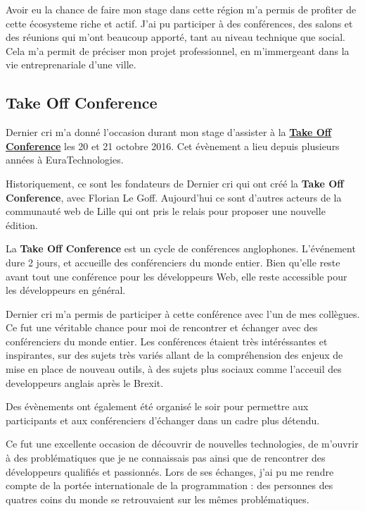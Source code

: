 \bigskip

Avoir eu la chance de faire mon stage dans cette région m'a permis de
profiter de cette écosysteme riche et actif. J'ai pu participer à des
conférences, des salons et des réunions qui m'ont beaucoup apporté, tant
au niveau technique que social. Cela m'a permit de préciser mon projet
professionnel, en m'immergeant dans la vie entreprenariale d'une ville.

\bigskip

\subsection{Take Off Conference}\label{take-off-conference}

\bigskip

Dernier cri m'a donné l'occasion durant mon stage d'assister à la
\href{http://takeoffconf.com/2016}{\textbf{Take Off Conference}} les 20
et 21 octobre 2016. Cet évènement a lieu depuis plusieurs années à
EuraTechnologies.

\bigskip

Historiquement, ce sont les fondateurs de Dernier cri qui ont créé la
\textbf{Take Off Conference}, avec Florian Le Goff. Aujourd'hui ce sont
d'autres acteurs de la communauté web de Lille qui ont pris le relais
pour proposer une nouvelle édition.

\bigskip

La \textbf{Take Off Conference} est un cycle de conférences anglophones.
L'événement dure 2 jours, et accueille des conférenciers du monde
entier. Bien qu'elle reste avant tout une conférence pour les
développeurs Web, elle reste accessible pour les développeurs en
général.

\bigskip

Dernier cri m'a permis de participer à cette conférence avec l'un de mes
collègues. Ce fut une véritable chance pour moi de rencontrer et
échanger avec des conférenciers du monde entier. Les conférences étaient
très intéréssantes et inspirantes, sur des sujets très variés allant de
la compréhension des enjeux de mise en place de nouveau outils, à des
sujets plus sociaux comme l'acceuil des developpeurs anglais après le
Brexit.

\bigskip

Des évènements ont également été organisé le soir pour permettre aux
participants et aux conférenciers d'échanger dans un cadre plus détendu.

\bigskip

Ce fut une excellente occasion de découvrir de nouvelles technologies,
de m'ouvrir à des problématiques que je ne connaissais pas ainsi que de
rencontrer des développeurs qualifiés et passionnés. Lors de ses
échanges, j'ai pu me rendre compte de la portée internationale de la
programmation : des personnes des quatres coins du monde se retrouvaient
sur les mêmes problématiques.

